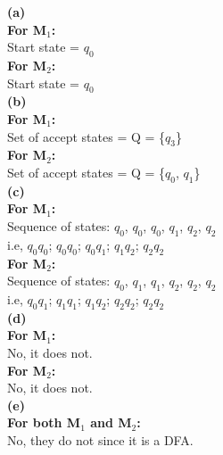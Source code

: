 \documentclass{homework}
\begin{document}
\question
\textbf{(a)}\\
\textbf{For M$_1$:}\\
Start state = $q_0$\\
\textbf{For M$_2$:}\\
Start state = $q_0$\\

\textbf{(b)}\\
\textbf{For M$_1$:}\\
Set of accept states = Q = \{$q_3$\}\\
\textbf{For M$_2$:}\\
Set of accept states = Q = \{$q_0$, $q_1$\}\\

\textbf{(c)}\\
\textbf{For M$_1$:}\\
Sequence of states: $q_0$, $q_0$, $q_0$, $q_1$, $q_2$, $q_2$\\
i.e, $q_0$\rightarrow$q_0$; $q_0$\rightarrow$q_0$; $q_0$\rightarrow$q_1$; $q_1$\rightarrow$q_2$; $q_2$\rightarrow$q_2$\\
\textbf{For M$_2$:}\\
Sequence of states: $q_0$, $q_1$, $q_1$, $q_2$, $q_2$, $q_2$\\
i.e, $q_0$\rightarrow$q_1$; $q_1$\rightarrow$q_1$; $q_1$\rightarrow$q_2$; $q_2$\rightarrow$q_2$; $q_2$\rightarrow$q_2$\\

\textbf{(d)}\\
\textbf{For M$_1$:}\\
No, it does not.\\
\textbf{For M$_2$:}\\
No, it does not.\\

\textbf{(e)}\\
\textbf{For both M$_1$ and M$_2$:}\\
No, they do not since it is a DFA.\\
\end{document}
